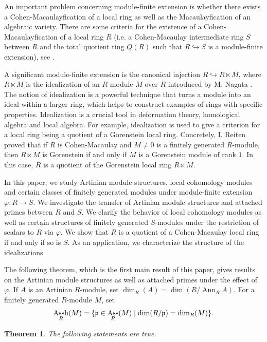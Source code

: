 \documentclass[a4papersize]{article}
\newtheorem{theorem}{Theorem}[section]
\DeclareMathOperator{\Ann}{Ann}
\DeclareMathOperator{\Ass}{Ass}
\DeclareMathOperator{\Assh}{Assh}
\begin{document}
{An important problem concerning module-finite extension is whether  there exists a Cohen-Macaulayfication of a local ring as well as the Macaulayfication of an algebraic variety. There are some  criteria for the existence of a Cohen-Macaulayfication of a local ring $R$ (i.e. a Cohen-Macaulay intermediate  ring $S$ between $R$ and the total  quotient ring $Q(R)$ such that  $R\hookrightarrow S$ is a module-finite extension), see \cite{AG, Sch1}.

A significant module-finite extension is the canonical injection $R\hookrightarrow R\ltimes M$, where  $R\ltimes M$ is the  idealization of an $R$-module $M$ over $R$ introduced by M. Nagata \cite{Na}. The notion of idealization  is  a powerful technique that turns a module into an ideal  within a larger ring, which helps to construct examples of  rings with  specific properties. Idealization is  a crucial tool in deformation theory, homological algebra and local algebra. For example, idealization is used to give a criterion for a local ring being a quotient of a Gorenstein local ring. Concretely, I. Reiten \cite{Re} proved that if $R$  is Cohen-Macaulay and $M\neq 0$ is a finitely generated $R$-module, then $R\ltimes M$  is Gorenstein if and only if $M$ is a Gorenstein module of rank $1.$ In this case, $R$ is a quotient of the Gorenstein local ring $R\ltimes M.$ 
	
In this paper, we study Artinian module structures, local cohomology modules and certain  classes of finitely generated modules  under module-finite extension $\varphi:R\to S.$   We investigate  the transfer of Artinian module structures and attached primes between $R$ and $S$.  We clarify the behavior of local cohomology modules as well as certain structures of finitely generated $S$-modules under the restriction of scalars to $R$ via $\varphi$. We show that $R$ is a quotient of a Cohen-Macaulay local ring if and only if so is $S$. As an application, we characterize the structure of the idealizations. 
	 
 The following theorem, which is the first main result of this paper, gives results on the Artinian module structures as well as attached primes under the effect of $\varphi$. If $A$ is an Artinian $R$-module,  set $\dim_R(A)=\dim(R/\Ann_RA).$    For a finitely generated $R$-module $M$, set $$\Assh_R(M)=\{\frak p\in\Ass_R(M)\mid \dim(R/\frak p)=\dim_R(M)\}.$$

\begin{theorem}\label{T:1a} The following statements are true. 
\begin{itemize}


\end{itemize}
\end{theorem}}
\end{document}
